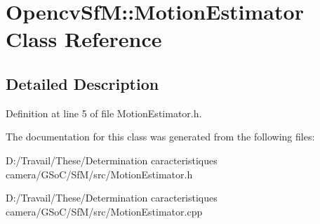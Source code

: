 \hypertarget{class_opencv_sf_m_1_1_motion_estimator}{
\section{OpencvSfM::MotionEstimator Class Reference}
\label{class_opencv_sf_m_1_1_motion_estimator}
}


\subsection{Detailed Description}


Definition at line 5 of file MotionEstimator.h.



The documentation for this class was generated from the following files:\begin{DoxyCompactItemize}
\item 
D:/Travail/These/Determination caracteristiques camera/GSoC/SfM/src/MotionEstimator.h\item 
D:/Travail/These/Determination caracteristiques camera/GSoC/SfM/src/MotionEstimator.cpp\end{DoxyCompactItemize}
